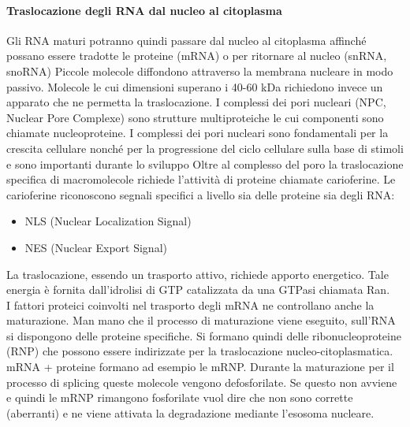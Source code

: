 \documentclass{article}
\begin{document}
\paragraph{Traslocazione degli RNA dal nucleo al citoplasma}
Gli RNA maturi potranno quindi passare dal nucleo al citoplasma affinché possano essere tradotte le proteine (mRNA) o per ritornare al nucleo (snRNA, snoRNA)
Piccole molecole diffondono attraverso la membrana nucleare in modo passivo.
Molecole le cui dimensioni superano i 40-60 kDa richiedono invece un apparato che ne permetta la traslocazione.
I complessi dei pori nucleari (NPC, Nuclear Pore Complexe) sono strutture multiproteiche le cui componenti sono
chiamate nucleoproteine.
I complessi dei pori nucleari sono fondamentali per la crescita cellulare nonché per la progressione del ciclo cellulare
sulla base di stimoli e sono importanti durante lo sviluppo
Oltre al complesso del poro la traslocazione specifica di macromolecole richiede l'attività di proteine chiamate carioferine.
Le carioferine riconoscono segnali specifici a livello sia delle proteine sia degli RNA:
\begin{itemize}
    \item NLS (Nuclear Localization Signal)
    \item NES (Nuclear Export Signal)
\end{itemize}
La traslocazione, essendo un trasporto attivo, richiede apporto energetico. Tale energia è fornita dall'idrolisi di GTP catalizzata da una GTPasi chiamata Ran.\\
I fattori proteici coinvolti nel trasporto degli mRNA ne controllano anche la maturazione. Man mano che il processo di
maturazione viene eseguito, sull'RNA si dispongono delle proteine specifiche. Si formano quindi delle ribonucleoproteine
(RNP) che possono essere indirizzate per la traslocazione nucleo-citoplasmatica.\\
mRNA + proteine formano ad esempio le mRNP. Durante la maturazione per il processo di splicing queste molecole
vengono defosforilate. Se questo non avviene e quindi le mRNP rimangono fosforilate vuol dire che non sono corrette
(aberranti) e ne viene attivata la degradazione mediante l'esosoma nucleare.
\end{document}

